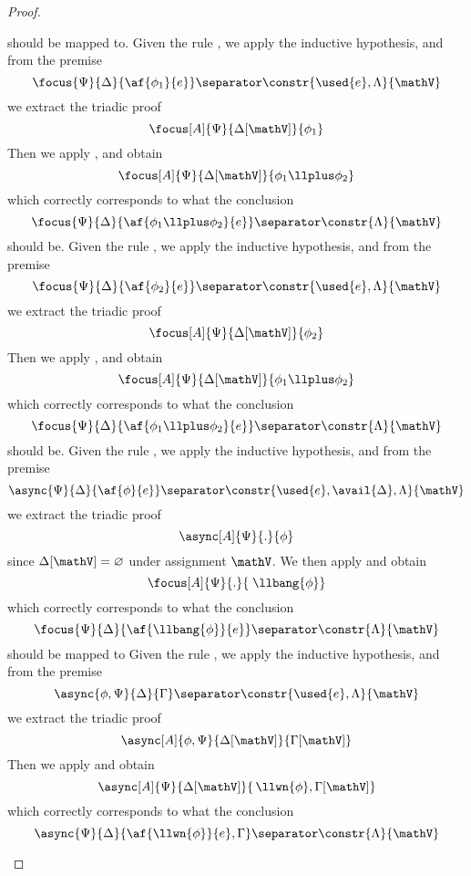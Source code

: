 \begin{proof}
\begin{itemize}
			should be mapped to.
		\indCase{\displayplus[L]} Given the rule \derRule{\displayplus[L]}, we apply the inductive hypothesis, and from the premise
			$$ \focus{\Psi}{\Delta}{\af{\phi_1}{e}} \separator \constr{\used{e}, \Lambda}{\mathV}$$
			we extract the triadic proof
			$$ \focus[A]{\Psi}{\Delta[\mathV]}{\phi_1} $$
			Then we apply \derRule[A]{\displayplus[L]}, and obtain
			$$ \focus[A]{\Psi}{\Delta[\mathV]}{\phi_1 \llplus \phi_2} $$
			which correctly corresponds to what the conclusion
			$$ \focus{\Psi}{\Delta}{\af{\phi_1 \llplus \phi_2}{e}} \separator \constr{\Lambda}{\mathV} $$
			should be.
		\indCase{\displayplus[R]} Given the rule \derRule{\displayplus[R]}, we apply the inductive hypothesis, and from the premise
			$$ \focus{\Psi}{\Delta}{\af{\phi_2}{e}} \separator \constr{\used{e}, \Lambda}{\mathV}$$
			we extract the triadic proof
			$$ \focus[A]{\Psi}{\Delta[\mathV]}{\phi_2} $$
			Then we apply \derRule[A]{\displayplus[R]}, and obtain
			$$ \focus[A]{\Psi}{\Delta[\mathV]}{\phi_1 \llplus \phi_2} $$
			which correctly corresponds to what the conclusion
			$$ \focus{\Psi}{\Delta}{\af{\phi_1 \llplus \phi_2}{e}} \separator \constr{\Lambda}{\mathV} $$
			should be.
		\indCase{\displaybang} Given the rule \derRule{\displaybang}, we apply the inductive hypothesis, and from the premise
			$$ \async{\Psi}{\Delta}{\af{\phi}{e}} \separator \constr{\used{e}, \avail{\Delta}, \Lambda}{\mathV} $$
			we extract the triadic proof
			$$ \async[A]{\Psi}{.}{\phi} $$
			since $\Delta[\mathV] = \varnothing$ under assignment $\mathV$.
			We then apply \derRule[A]{\displaybang} and obtain
			$$ \focus[A]{\Psi}{.}{\;\llbang{\phi}} $$
			which correctly corresponds to what the conclusion 
			$$ \focus{\Psi}{\Delta}{\af{\llbang{\phi}}{e}} \separator \constr{\Lambda}{\mathV} $$
			should be mapped to
		\indCase{\displaywn} Given the rule \derRule{\displaywn}, we apply the inductive hypothesis, and from the premise
			$$ \async{\phi, \Psi}{\Delta}{\Gamma} \separator \constr{\used{e}, \Lambda}{\mathV} $$
			we extract the triadic proof
			$$ \async[A]{\phi, \Psi}{\Delta[\mathV]}{\Gamma[\mathV]}$$
			Then we apply \derRule[A]{\displaywn} and obtain
			$$ \async[A]{\Psi}{\Delta[\mathV]}{\,\llwn{\phi}, \Gamma[\mathV]} $$
			which correctly corresponds to what the conclusion
			$$ \async{\Psi}{\Delta}{\af{\llwn{\phi}}{e}, \Gamma} \separator \constr{\Lambda}{\mathV} $$

\end{itemize}
\end{proof}
